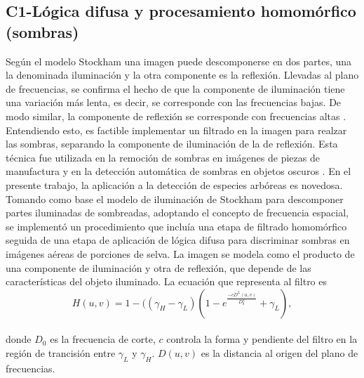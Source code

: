 \subsection{C1-Lógica difusa y procesamiento homomórfico (sombras)}
Según el modelo Stockham \cite{stockham_image_1972} una imagen puede descomponerse en dos partes, una la denominada iluminación y la otra componente es la reflexión. Llevadas al plano de frecuencias, se confirma el hecho de que la componente de iluminación tiene una variación más lenta, es decir, se corresponde con las frecuencias bajas. De modo similar, la componente de reflexión se corresponde con frecuencias altas \cite{oppenheim_nonlinear_1968}. Entendiendo esto, es factible implementar un filtrado en la imagen para realzar las sombras, separando la componente de iluminación de la de reflexión. Esta técnica fue utilizada en la remoción de sombras en imágenes de piezas de manufactura \cite{yang_research_2012} y en la detección automática de sombras en objetos oscuros \cite{etemadnia_automatic_2003}. En el presente trabajo, la aplicación a la detección de especies arbóreas es novedosa. 
Tomando como base el modelo de iluminación de Stockham para descomponer partes iluminadas de sombreadas, adoptando el concepto de frecuencia espacial, se implementó un procedimiento que incluía una etapa de filtrado homomórfico seguida de una etapa de aplicación de lógica difusa para discriminar sombras en imágenes aéreas de porciones de selva.
La imagen se modela como el producto de una componente de iluminación y otra de reflexión, que depende de las características del objeto iluminado. 
La ecuación que representa al filtro es
\\
\begin{equation}
	H(u,v)=1-((\gamma_H-\gamma_L)(1-e^{\frac{-cD^L(u,v)}{D^L_0}}+\gamma_L),\label{filtro homomorfico}
\end{equation}
\\


donde $D_0$ es la frecuencia de corte, $c$ controla la forma y pendiente del filtro en la región de trancisión entre $\gamma_L$ y $\gamma_H$. $D(u,v)$ es la distancia al origen del plano de frecuencias.

